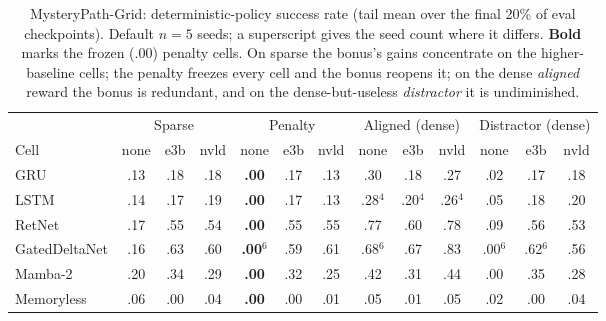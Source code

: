 \begin{table}[t]\centering
\caption{MysteryPath-Grid: deterministic-policy success rate (tail mean over the final 20\% of eval checkpoints). Default $n{=}5$ seeds; a superscript gives the seed count where it differs. \textbf{Bold} marks the frozen ($.00$) penalty cells. On sparse the bonus's gains concentrate on the higher-baseline cells; the penalty freezes every cell and the bonus reopens it; on the dense \emph{aligned} reward the bonus is redundant, and on the dense-but-useless \emph{distractor} it is undiminished.}
\label{tab:mpg}\small
\begin{tabular}{@{}l ccc ccc ccc ccc@{}}\toprule
 & \multicolumn{3}{c}{Sparse} & \multicolumn{3}{c}{Penalty} & \multicolumn{3}{c}{Aligned (dense)} & \multicolumn{3}{c}{Distractor (dense)} \\
\cmidrule(lr){2-4}\cmidrule(lr){5-7}\cmidrule(lr){8-10}\cmidrule(lr){11-13}
Cell & none & e3b & nvld & none & e3b & nvld & none & e3b & nvld & none & e3b & nvld \\\midrule
GRU & .13 & .18 & .18 & \textbf{.00} & .17 & .13 & .30 & .18 & .27 & .02 & .17 & .18 \\
LSTM & .14 & .17 & .19 & \textbf{.00} & .17 & .13 & .28$^{4}$ & .20$^{4}$ & .26$^{4}$ & .05 & .18 & .20 \\
RetNet & .17 & .55 & .54 & \textbf{.00} & .55 & .55 & .77 & .60 & .78 & .09 & .56 & .53 \\
GatedDeltaNet & .16 & .63 & .60 & \textbf{.00}$^{6}$ & .59 & .61 & .68$^{6}$ & .67 & .83 & .00$^{6}$ & .62$^{6}$ & .56 \\
Mamba-2 & .20 & .34 & .29 & \textbf{.00} & .32 & .25 & .42 & .31 & .44 & .00 & .35 & .28 \\
Memoryless & .06 & .00 & .04 & \textbf{.00} & .00 & .01 & .05 & .01 & .05 & .02 & .00 & .04 \\
\bottomrule\end{tabular}\end{table}

